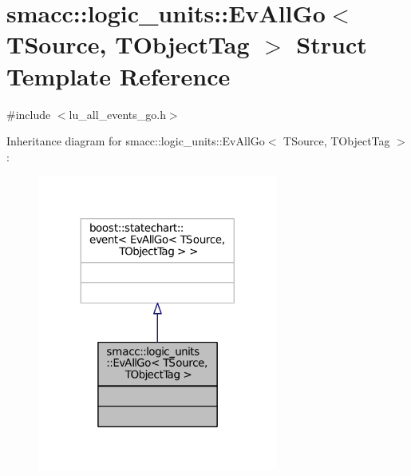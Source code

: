 \hypertarget{structsmacc_1_1logic__units_1_1EvAllGo}{}\section{smacc\+:\+:logic\+\_\+units\+:\+:Ev\+All\+Go$<$ T\+Source, T\+Object\+Tag $>$ Struct Template Reference}
\label{structsmacc_1_1logic__units_1_1EvAllGo}


{\ttfamily \#include $<$lu\+\_\+all\+\_\+events\+\_\+go.\+h$>$}



Inheritance diagram for smacc\+:\+:logic\+\_\+units\+:\+:Ev\+All\+Go$<$ T\+Source, T\+Object\+Tag $>$\+:
\nopagebreak
\begin{figure}[H]
\begin{center}
\leavevmode
\includegraphics[width=224pt]{structsmacc_1_1logic__units_1_1EvAllGo__inherit__graph}
\end{center}
\end{figure}


